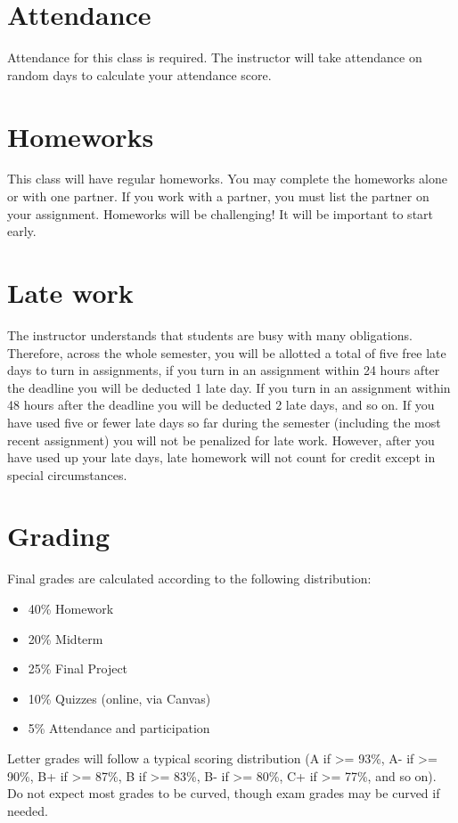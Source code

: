 \documentclass[10pt]{memoir}
\begin{document}
\section{\textbf{Attendance}}
Attendance for this class is required. The instructor will take attendance on random days to calculate your attendance score. 

\section{\textbf{Homeworks}}
This class will have regular homeworks. You may complete the homeworks alone or with one partner. If you work with a partner, you must list the partner on your assignment. Homeworks will be challenging! It will be important to start early.

\section{\textbf{Late work}}
The instructor understands that students are busy with many obligations. Therefore, across the whole semester, you will be allotted a total of five free late days to turn in assignments, if you turn in an assignment within 24 hours after the deadline you will be deducted 1 late day. If you turn in an assignment within 48 hours after the deadline you will be deducted 2 late days, and so on. If you have used five or fewer late days so far during the semester (including the most recent assignment) you will not be penalized for late work. However, after you have used up your late days, late homework will not count for credit except in special circumstances.

\section{\textbf{Grading}}

Final grades are calculated according to the following distribution:
\begin{itemize}
\item 40\% Homework
\item 20\% Midterm
\item 25\% Final Project
\item 10\% Quizzes (online, via Canvas)
\item 5\% Attendance and participation
\end{itemize}

Letter grades will follow a typical scoring distribution (A if >= 93\%, A- if >= 90\%, B+ if >=
87\%, B if >= 83\%, B- if >= 80\%, C+ if >= 77\%, and so on). Do not expect most grades to be
curved, though exam grades may be curved if needed.
\end{document}
